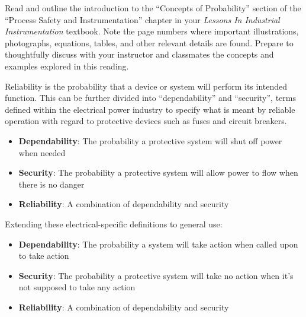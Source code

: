 

Read and outline the introduction to the ``Concepts of Probability'' section of the ``Process Safety and Instrumentation'' chapter in your {\it Lessons In Industrial Instrumentation} textbook.  Note the page numbers where important illustrations, photographs, equations, tables, and other relevant details are found.  Prepare to thoughtfully discuss with your instructor and classmates the concepts and examples explored in this reading.














Reliability is the probability that a device or system will perform its intended function.  This can be further divided into ``dependability'' and ``security'', terms defined within the electrical power industry to specify what is meant by reliable operation with regard to protective devices such as fuses and circuit breakers.  

\begin{itemize}
\item{} {\bf Dependability}: The probability a protective system will shut off power when needed 
\item{} {\bf Security}: The probability a protective system will allow power to flow when there is no danger
\item{} {\bf Reliability}: A combination of dependability and security 
\end{itemize}

\noindent
Extending these electrical-specific definitions to general use:

\begin{itemize}
\item{} {\bf Dependability}: The probability a system will take action when called upon to take action
\item{} {\bf Security}: The probability a protective system will take no action when it's not supposed to take any action
\item{} {\bf Reliability}: A combination of dependability and security 
\end{itemize}








